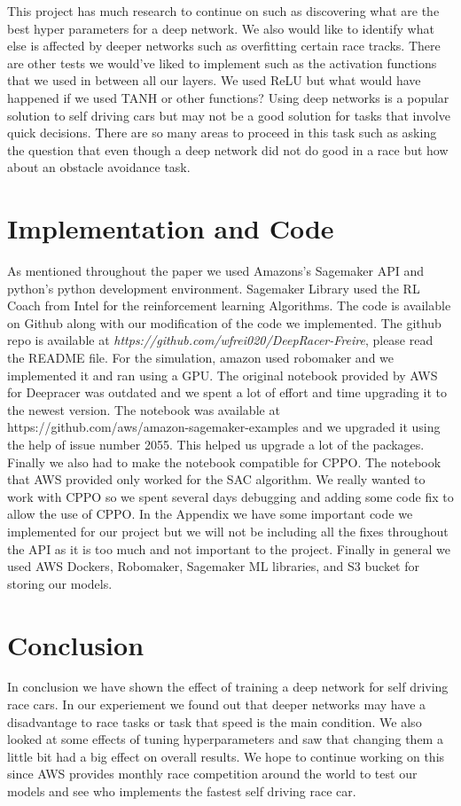 \documentclass[journal]{IEEEtran}
\begin{document}
This project has much research to continue on such as discovering what are the best hyper parameters for a deep network.  We also would like to identify what else is affected by deeper networks such as overfitting certain race tracks.  There are other tests we would've liked to implement such as the activation functions that we used in between all our layers.  We used ReLU but what would have happened if we used TANH or other functions?  Using deep networks is a popular solution to self driving cars but may not be a good solution for tasks that involve quick decisions.  There are so many areas to proceed in this task such as asking the question that even though a deep network did not do good in a race but how about an obstacle avoidance task.



\section{Implementation and Code}
As mentioned throughout the paper we used Amazons’s Sagemaker API and python’s python development environment.  Sagemaker Library used the RL Coach from Intel for the reinforcement learning Algorithms.  The code is available on Github along with our modification of the code we implemented.  The github repo is available at \emph{https://github.com/wfrei020/DeepRacer-Freire}, please read the README file.  For the simulation, amazon used robomaker and we implemented it and ran using a GPU.  The original notebook provided by AWS for Deepracer was outdated and we spent a lot of effort and time upgrading it to the newest version.  The notebook was available at https://github.com/aws/amazon-sagemaker-examples and we upgraded it using the help of issue number 2055.  This helped us upgrade a lot of the packages.  Finally we also had to make the notebook compatible for CPPO.  The notebook that AWS provided only worked for the SAC algorithm.  We really wanted to work with CPPO so we spent several days debugging and adding some code fix to allow the use of CPPO.  In the Appendix we have some important code we implemented for our project but we will not be including all the fixes throughout the API as it is too much and not important to the project. Finally in general we used AWS Dockers, Robomaker, Sagemaker ML libraries, and S3 bucket for storing our models. 

\section{Conclusion}
In conclusion we have shown the effect of training a deep network for self driving race cars.  In our experiement we found out that deeper networks may have a disadvantage to race tasks or task that speed is the main condition.  We also looked at some effects of tuning hyperparameters and saw that changing them a little bit had a big effect on overall results.  We hope to continue working on this since AWS provides monthly race competition around the world to test our models and see who implements the fastest self driving race car.
\end{document}
